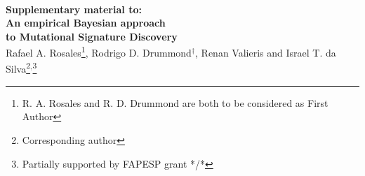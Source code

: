 \documentclass[11pt]{amsart}
\theoremstyle{definition}
\theoremstyle{remark}
\begin{document}
\title[R. A. Rosales, R. D. Drummond, R. Valieris, I. T. da Silva]{}
\\[1em]
 \begin{center}
   {\Large\bf Supplementary material to:\\[0.4em]
   An empirical Bayesian approach\\[0.3em] 
   to Mutational Signature Discovery\\[2em]}
   {\large 
     Rafael A. Rosales\footnote{R. A. Rosales and R. D. Drummond are
       both to be considered as First Author}, 
     Rodrigo D. Drummond$^\dagger$,
     Renan Valieris and 
     Israel T. da Silva\footnote{Corresponding
       author}$^,$\footnote{Partially supported by FAPESP grant */*}}
 \end{center}


\maketitle

\end{document}
